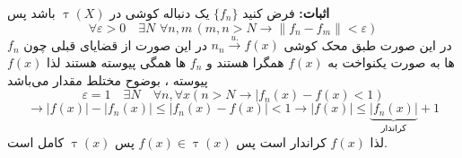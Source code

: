 \documentclass[12pt]{report}
\begin{document}
\textbf{اثبات:}
فرض کنید 
$\{f_n\}$
یک دنباله کوشی  در 
$\uptau(X)$
باشد پس
\[
\forall \varepsilon > 0 \quad \exists N \,\, \forall n , m \, (m ,n > N \rightarrow \lVert f_n - f_m \rVert  < \varepsilon)
\]
در این صورت طبق محک کوشی 
$n_n  \overset{u.}{\rightarrow} f(x)$
در این صورت از قضایای قبلی چون
$f_n$
ها به صورت یکنواخت به 
$f(x)$
همگرا هستند و 
$f_n$
ها همگی پیوسته هستند لذا 
$f(x)$
پیوسته ، بوضوح مختلط مقدار می‌باشد
\[
\varepsilon = 1 \quad \exists N \quad \forall n , \forall x (n > N \rightarrow |f_n(x) - f(x) < 1) 
\]
\[
\rightarrow |f(x)| - |f_n(x)| \leq |f_n(x) - f(x)| < 1 \rightarrow |f(x)| \leq \underbrace{|f_n(x)|}_{\text{کراندار}} + 1
\]
لذا 
$f(x)$
کراندار است پس
$f(x) \in \uptau(x)$
پس 
$\uptau(x)$
کامل است.

 
\end{document}
